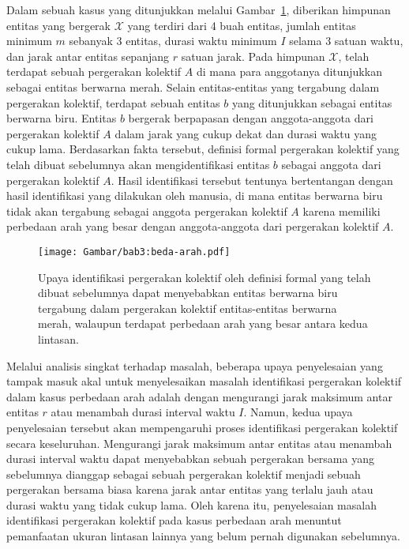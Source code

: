 Dalam sebuah kasus yang ditunjukkan melalui Gambar~\ref{bab3:masalah-arah}, diberikan himpunan entitas yang bergerak $\mathcal{X}$ yang terdiri dari 4 buah entitas, jumlah entitas minimum $m$ sebanyak $3$ entitas, durasi waktu minimum $I$ selama $3$ satuan waktu, dan jarak antar entitas sepanjang $r$ satuan jarak. Pada himpunan $\mathcal{X}$, telah terdapat sebuah pergerakan kolektif $A$ di mana para anggotanya ditunjukkan sebagai entitas berwarna merah. Selain entitas-entitas yang tergabung dalam pergerakan kolektif, terdapat sebuah entitas $b$ yang ditunjukkan sebagai entitas berwarna biru. Entitas $b$ bergerak berpapasan dengan anggota-anggota dari pergerakan kolektif $A$ dalam jarak yang cukup dekat dan durasi waktu yang cukup lama. Berdasarkan fakta tersebut, definisi formal pergerakan kolektif yang telah dibuat sebelumnya akan mengidentifikasi entitas $b$ sebagai anggota dari pergerakan kolektif $A$. Hasil identifikasi tersebut tentunya bertentangan dengan hasil identifikasi yang dilakukan oleh manusia, di mana entitas berwarna biru tidak akan tergabung sebagai anggota pergerakan kolektif $A$ karena memiliki perbedaan arah yang besar dengan anggota-anggota dari pergerakan kolektif $A$.

\begin{figure}[t]
    \centering
    \captionsetup{width=0.8\textwidth}
    \texttt{[image: Gambar/bab3:beda-arah.pdf]}
    \caption[Masalah identifikasi pada kasus perbedaan arah]{Upaya identifikasi pergerakan kolektif oleh definisi formal yang telah dibuat sebelumnya dapat menyebabkan entitas berwarna biru tergabung dalam pergerakan kolektif entitas-entitas berwarna merah, walaupun terdapat perbedaan arah yang besar antara kedua lintasan.}
    \label{bab3:masalah-arah}
\end{figure}
    
Melalui analisis singkat terhadap masalah, beberapa upaya penyelesaian yang tampak masuk akal untuk menyelesaikan masalah identifikasi pergerakan kolektif dalam kasus perbedaan arah adalah dengan mengurangi jarak maksimum antar entitas $r$ atau menambah durasi interval waktu $I$. Namun, kedua upaya penyelesaian tersebut akan mempengaruhi proses identifikasi pergerakan kolektif secara keseluruhan. Mengurangi jarak maksimum antar entitas atau menambah durasi interval waktu dapat menyebabkan sebuah pergerakan bersama yang sebelumnya dianggap sebagai sebuah pergerakan kolektif menjadi sebuah pergerakan bersama biasa karena jarak antar entitas yang terlalu jauh atau durasi waktu yang tidak cukup lama. Oleh karena itu, penyelesaian masalah identifikasi pergerakan kolektif pada kasus perbedaan arah menuntut pemanfaatan ukuran lintasan lainnya yang belum pernah digunakan sebelumnya.
    
